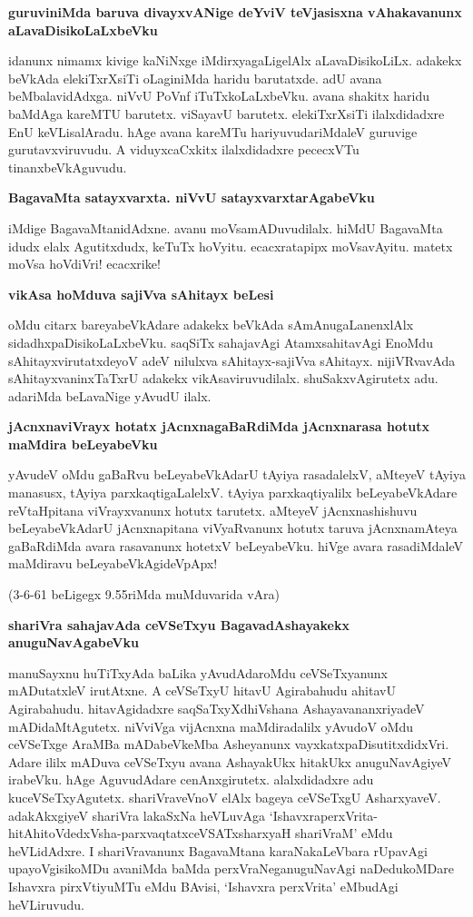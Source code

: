 {\bigskip
\noindent
{\large\bf guruviniMda baruva divayxvANige deYviV teVjasisxna vAhakavanunx aLavaDisi\-koLaLxbeVku}}\label{page79}
\medskip

\noindent
idanunx nimamx kivige kaNiNxge iMdirxyagaLigelAlx aLavaDisikoLiLx. adakekx beVkAda elekiTxrXsiTi oLaginiMda haridu barutatxde. adU avana beMbalavidAdxga. niVvU PoVnf iTuTxkoLaLxbeVku. avana shakitx haridu baMdAga kareMTU barutetx. viSayavU barutetx. elekiTxrXsiTi ilalxdidadxre EnU keVLisalAradu. hAge avana kareMTu hariyuvudariMdaleV guruvige gurutavxviruvudu. A viduyxcaCxkitx ilalxdidadxre pececxVTu tinanxbeVkA\-guvudu.

{\bigskip
\noindent
{\large\bf BagavaMta satayxvarxta. niVvU satayxvarxtarAgabeVku}}\label{page79}
\medskip

\noindent
iMdige BagavaMtanidAdxne. avanu moVsamADuvudilalx. hiMdU BagavaMta idudx elalx Agutitxdudx, keTuTx hoVyitu. ecacxratapipx moVsavAyitu. matetx moVsa hoVdiVri! ecacxrike!

{\bigskip
\noindent
{\large\bf vikAsa hoMduva sajiVva sAhitayx beLesi}}
\medskip

\noindent
oMdu citarx bareyabeVkAdare adakekx beVkAda sAmAnugaLanenxlAlx sidadhxpaDisi\-koLaLxbeVku. saqSiTx sahaja\-vAgi AtamxsahitavAgi EnoMdu sAhitayxvirutatxdeyoV adeV nilulxva sAhitayx-sajiVva sAhitayx. nijiVRva\-vAda sAhitayxvaninxTaTxrU adakekx vikAsaviruvudilalx. shuSakxvAgirutetx adu. adariMda beLavaNige yAvudU ilalx.

{\bigskip
\noindent
{\large\bf jAcnxnaviVrayx hotatx jAcnxnagaBaRdiMda jAcnxnarasa hotutx maMdira beLeyabeVku}}\label{page79}
\medskip

\noindent
yAvudeV oMdu gaBaRvu beLeyabeVkAdarU tAyiya rasadalelxV, aMteyeV tAyiya manasusx,\- tAyiya parxkaqtigaLalelxV. tAyiya parxkaqtiyalilx beLeyabeVkAdare reVtaHpitana viVrayxvanunx hotutx tarutetx. aMteyeV jAcnxnashishuvu beLeyabeVkAdarU jAcnxnapitana viVyaRvanunx hotutx taruva jAcnxna\-mAteya gaBaR\-diMda avara rasa\-vanunx hotetxV beLeyabeVku. hiVge avara rasadiMdaleV maMdiravu beLeya\break\-beVkAgideVpApx!


(3-6-61 beLigegx 9.55riMda muMduvarida vAra)

{\bigskip
\noindent
{\large\bf shariVra sahajavAda ceVSeTxyu BagavadAshayakekx anuguNavAgabeVku}}\label{page80}
\medskip

\noindent
manuSayxnu huTiTxyAda baLika yAvudAdaroMdu ceVSeTxyanunx mADutatxleV irutAtxne. A ceV\-SeTxyU hitavU Agirabahudu ahitavU Agirabahudu. hitavAgidadxre saqSaTxyXdhiVshana AshayavananxriyadeV mADi\-daMtAgutetx. niVviVga vijAcnxna maMdiradalilx yAvudoV oMdu ceVSeTxge AraMBa mADabeVkeMba Ashe\-yanunx vayxkatxpaDisutitxdidxVri. Adare ililx mADuva ceVSeTxyu avana AshayakUkx hitakUkx anuguNavAgiyeV irabeVku. hAge AguvudAdare cenAnxgirutetx. alalxdidadxre adu kuceVSeTxyAgutetx. shariVraveVnoV elAlx bageya ceVSeTxgU AsharxyaveV. adakAkxgiyeV shariVra lakaSxNa heVLuvAga `IshavxraperxVrita-hitAhitoVdedxVsha-\-parxvaqtatxceVSATxsharxyaH shariVraM'\label{80} eMdu heVLidAdxre. I shariVravanunx BagavaMtana karaNakaLeVbara rUpavAgi upayoVgisikoMDu avaniMda baMda perxVraNeganuguNavAgi naDedukoMDare Ishavxra pirxVtiyuMTu eMdu BAvisi, `Ishavxra perxVrita' eMbudAgi heVLiruvudu.

